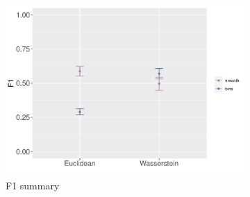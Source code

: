 \begin{figure}[ht!]
    \begin{subfigure}{\textwidth}
    \includegraphics[scale=0.8]{graphics/f1_gle.pdf}
    \caption{F1 summary}
    \label{fig:f1_gle}
    \end{subfigure}
    \vspace{0.5cm}
\caption{}    
    \label{fig:ml_gle}
\end{figure}
